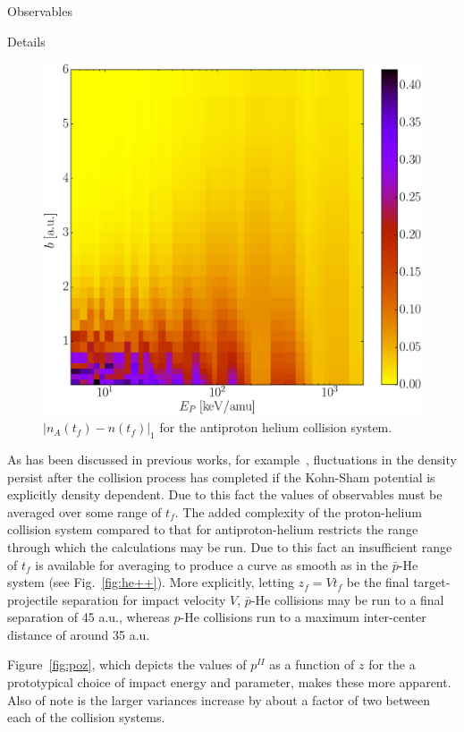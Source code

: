 \documentclass[letterpaper, 11 pt]{report}
\begin{document}
\begin{chapter}{Observables \label{chap:p-he2p-he}}
\begin{section}{Details \label{sec:phe2p-det}}
\begin{figure}[ht]
\begin{minipage}{.49\linewidth}
            \centering
            \includegraphics[width = \linewidth]{./images/dendiff.eps}
            \caption[Density difference]
                   {$\left| n_A\left(t_f \right) - n\left(t_f\right)\right|_1$ for the antiproton
                    helium collision system. \label{fig:l1}}
         \end{minipage}
      \end{figure}

      As has been discussed in previous works, for example~\cite{microresp,pbarhe}, fluctuations in the
      density persist after the collision process has completed if the Kohn-Sham potential is explicitly
      density dependent. Due to this fact the values of observables must be averaged over some range of
      $t_f$. The added complexity of the proton-helium collision system compared to that for
      antiproton-helium restricts the range through which the calculations may be run. Due to this fact
      an insufficient range of $t_f$ is available for averaging to produce a curve as smooth as in the
      $\bar{p}$-He system (see Fig.~\ref{fig:he++}). More explicitly, letting $z_f = V t_f$ be the final
      target-projectile separation for impact velocity $V$, $\bar{p}$-He collisions may be run to a
      final separation of 45 a.u., whereas $p$-He collisions run to a maximum inter-center distance of
      around 35 a.u.
      
      Figure~\ref{fig:poz}, which depicts the values of $p^{II}$ as a function of $z$ for the a
      prototypical choice of impact energy and parameter, makes these more apparent. Also of note is the
      larger variances increase by about a factor of two between each of the collision systems.


\end{section}
\end{chapter}
\end{document}

